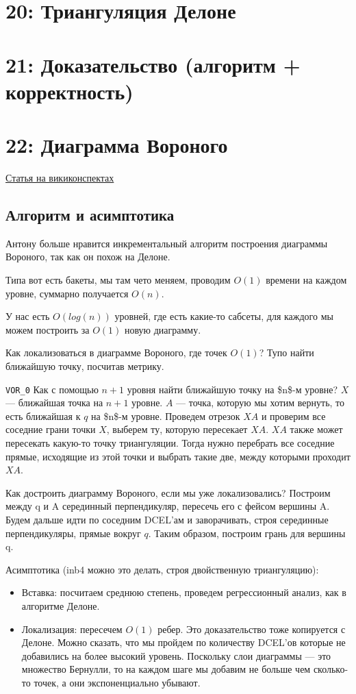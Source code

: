 \documentclass[11pt]{article}
\begin{document}
\section{{\bfseries{}} 20: Триангуляция Делоне}
\label{sec:orgheadline50}
\section{{\bfseries{}} 21: Доказательство (алгоритм + корректность)}
\label{sec:orgheadline51}
\section{{\bfseries{}} 22: Диаграмма Вороного}
\label{sec:orgheadline58}
\href{http://neerc.ifmo.ru/wiki/index.php?title=Диаграмма_Вороного}{Статья на викиконспектах}
\subsection{Алгоритм и асимптотика}
\label{sec:orgheadline52}
Антону больше нравится инкрементальный алгоритм построения диаграммы
Вороного, так как он похож на Делоне.

Типа вот есть бакеты, мы там чето меняем, проводим \(O(1)\) времени на
каждом уровне, суммарно получается \(O(n)\).

У нас есть \(O(log(n))\) уровней, где есть какие-то сабсеты, для
каждого мы можем построить за \(O(1)\) новую диаграмму.

Как локализоваться в диаграмме Вороного, где точек \(O(1)\)? Тупо
найти ближайшую точку, посчитав метрику.

\texttt{VOR\_0}
Как с помощью \(n+1\) уровня найти ближайшую точку на \$n\$-м уровне?
\(X\) --- ближайшая точка на \(n+1\) уровне. \(A\) --- точка, которую мы хотим
вернуть, то есть ближайшая к \(q\) на \$n\$-м уровне. Проведем отрезок \(XA\) и
проверим все соседние грани точки \(X\), выберем ту, которую пересекает
\(XA\). \(XA\) также может пересекать какую-то точку триангуляции. Тогда
нужно перебрать все соседние прямые, исходящие из этой точки и
выбрать такие две, между которыми проходит \(XA\).

Как достроить диаграмму Вороного, если мы уже локализовались?
Построим между q и A серединный перпендикуляр, пересечь его с фейсом
вершины A. Будем дальше идти по соседним DCEL'ам и заворачивать,
строя серединные перпендикуляры, прямые вокруг \(q\). Таким образом,
построим грань для вершины q.

Асимптотика (inb4 можно это делать, строя двойственную триангуляцию):
\begin{itemize}
\item Вставка: посчитаем среднюю степень, проведем регрессионный анализ,
как в алгоритме Делоне.
\item Локализация: пересечем \(O(1)\) ребер. Это доказательство тоже
копируется с Делоне. Можно сказать, что мы пройдем по количеству
DCEL'ов которые не добавились на более высокий уровень. Поскольку
слои диаграммы --- это множество Бернулли, то на каждом шаге мы
добавим не больше чем сколько-то точек, а они экспоненциально
убывают.
\end{itemize}
\end{document}
